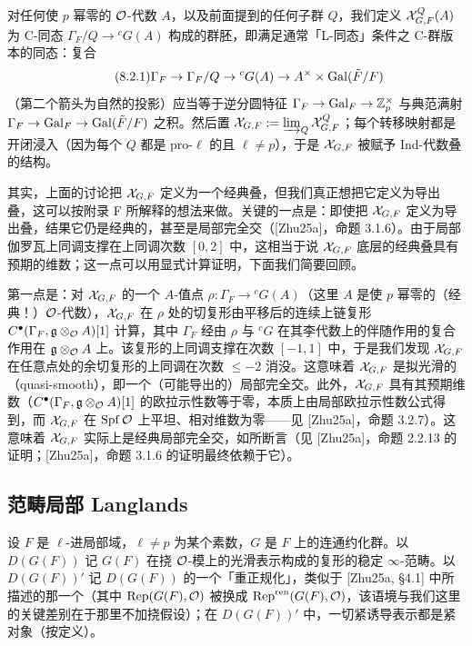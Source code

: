 对任何使 $p$ 幂零的 $\mathcal{O}$-代数 $A$，以及前面提到的任何子群 $Q$，我们定义 $\mathcal{X}^Q_{G,F}(A)$ 为 C-同态 $\Gamma_F/Q\to{}^cG(A)$ 构成的群胚，即满足通常「L-同态」条件之 C-群版本的同态：复合
\begin{equation}\tag{8.2.1}\label{eq:a4-8-2-1}
\Gamma_F\to\Gamma_F/Q\to{}^cG(A)\to A^\times\times\operatorname{Gal}(\tilde F/F)
\end{equation}
（第二个箭头为自然的投影）应当等于逆分圆特征 $\Gamma_F\to\operatorname{Gal}_F\to\mathbb{Z}_p^\times$ 与典范满射 $\Gamma_F\to\operatorname{Gal}_F\to\operatorname{Gal}(\tilde F/F)$ 之积。然后置 $\mathcal{X}_{G,F}:=\varinjlim_Q\mathcal{X}^Q_{G,F}$；每个转移映射都是开闭浸入（因为每个 $Q$ 都是 pro-$\ell$ 的且 $\ell\neq p$），于是 $\mathcal{X}_{G,F}$ 被赋予 Ind-代数叠的结构。

其实，上面的讨论把 $\mathcal{X}_{G,F}$ 定义为一个经典叠，但我们真正想把它定义为导出叠，这可以按附录 F 所解释的想法来做。关键的一点是：即使把 $\mathcal{X}_{G,F}$ 定义为导出叠，结果它仍是经典的，甚至是局部完全交（[Zhu25a]，命题 3.1.6）。由于局部伽罗瓦上同调支撑在上同调次数 $[0,2]$ 中，这相当于说 $\mathcal{X}_{G,F}$ 底层的经典叠具有预期的维数；这一点可以用显式计算证明，下面我们简要回顾。

第一点是：对 $\mathcal{X}_{G,F}$ 的一个 $A$-值点 $\rho:\Gamma_F\to{}^cG(A)$（这里 $A$ 是使 $p$ 幂零的（经典！）$\mathcal{O}$-代数），$\mathcal{X}_{G,F}$ 在 $\rho$ 处的切复形由平移后的连续上链复形 $C^\bullet(\Gamma_F,\mathfrak g\otimes_{\mathcal{O}} A)[1]$ 计算，其中 $\Gamma_F$ 经由 $\rho$ 与 ${}^cG$ 在其李代数上的伴随作用的复合作用在 $\mathfrak g\otimes_{\mathcal{O}} A$ 上。该复形的上同调支撑在次数 $[-1,1]$ 中，于是我们发现 $\mathcal{X}_{G,F}$ 在任意点处的余切复形的上同调在次数 $\le-2$ 消没。这意味着 $\mathcal{X}_{G,F}$ 是拟光滑的（quasi-smooth），即一个（可能导出的）局部完全交。此外，$\mathcal{X}_{G,F}$ 具有其预期维数（$C^\bullet(\Gamma_F,\mathfrak g\otimes_{\mathcal{O}} A)[1]$ 的欧拉示性数等于零，本质上由局部欧拉示性数公式得到，而 $\mathcal{X}_{G,F}$ 在 $\operatorname{Spf}\mathcal{O}$ 上平坦、相对维数为零——见 [Zhu25a]，命题 3.2.7）。这意味着 $\mathcal{X}_{G,F}$ 实际上是经典局部完全交，如所断言（见 [Zhu25a]，命题 2.2.13 的证明；[Zhu25a]，命题 3.1.6 的证明最终依赖于它）。

\subsection{范畴局部 Langlands}
设 $F$ 是 $\ell$-进局部域，$\ell\neq p$ 为某个素数，$G$ 是 $F$ 上的连通约化群。以 $D(G(F))$ 记 $G(F)$ 在挠 $\mathcal{O}$-模上的光滑表示构成的复形的稳定 $\infty$-范畴。以 $D(G(F))'$ 记 $D(G(F))$ 的一个「重正规化」，类似于 [Zhu25a, §4.1] 中所描述的那一个（其中 $\operatorname{Rep}(G(F),\mathcal{O})$ 被换成 $\operatorname{Rep}^{\mathrm{ren}}(G(F),\mathcal{O})$，该语境与我们这里的关键差别在于那里不加挠假设）；在 $D(G(F))'$ 中，一切紧诱导表示都是紧对象（按定义）。

